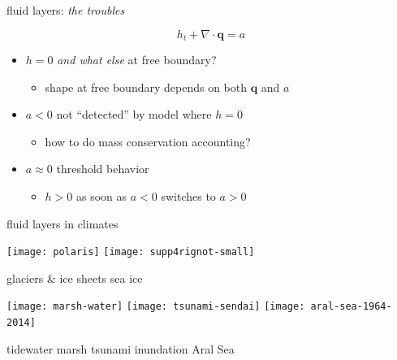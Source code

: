 \documentclass[xcolor={dvipsnames}]{beamer}
\newcommand\bq{\mathbf{q}}
\newcommand\Div{\nabla\cdot}
\begin{document}
\begin{frame}{fluid layers: \emph{the troubles}}

\vspace{-1.2mm}

\begin{center}
\end{center}

\vspace{-18mm}
$$h_t + \Div\bq = a$$

  \begin{itemize}
  \item<1-> $h=0$ \emph{and what else} at free boundary?
     \begin{itemize}
     \item<1->[$\circ$] shape at free boundary depends on both $\bq$ and $a$
     \end{itemize}
  \item<2-> $a<0$ not ``detected'' by model where $h=0$
     \begin{itemize}
     \item<2->[$\circ$] how to do mass conservation accounting?
     \end{itemize}
  \item<3> $a\approx 0$ threshold behavior
     \begin{itemize}
     \item<3>[$\circ$] $h>0$ as soon as $a<0$ switches to $a>0$
     \end{itemize}
  \end{itemize}
\end{frame}


\begin{frame}{fluid layers in climates}

\texttt{[image: polaris]}
\hfill
\texttt{[image: supp4rignot-small]}

\small glaciers \& ice sheets \hfill sea ice

\medskip
\texttt{[image: marsh-water]}
\quad \texttt{[image: tsunami-sendai]}
\quad \texttt{[image: aral-sea-1964-2014]}

\small tidewater marsh \hfill tsunami inundation \hfill \phantom{foo} Aral Sea\,
\end{frame}
\end{document}
